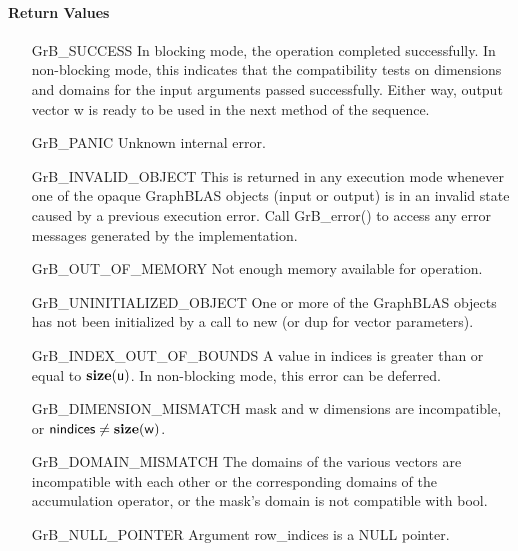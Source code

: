 \paragraph{Return Values}

\begin{itemize}[leftmargin=2.1in]
    \item[{\sf GrB\_SUCCESS}]         In blocking mode, the operation completed
    successfully. In non-blocking mode, this indicates that the compatibility 
    tests on dimensions and domains for the input arguments passed successfully. 
    Either way, output vector {\sf w} is ready to be used in the next method of 
    the sequence.

    \item[{\sf GrB\_PANIC}]           Unknown internal error.

    \item[{\sf GrB\_INVALID\_OBJECT}] This is returned in any execution mode 
    whenever one of the opaque GraphBLAS objects (input or output) is in an invalid 
    state caused by a previous execution error.  Call {\sf GrB\_error()} to access 
    any error messages generated by the implementation.

    \item[{\sf GrB\_OUT\_OF\_MEMORY}] Not enough memory available for operation.

    \item[{\sf GrB\_UNINITIALIZED\_OBJECT}] One or more of the GraphBLAS objects
    has not been initialized by a call to {\sf new} (or {\sf dup} for vector
    parameters).

    \item[{\sf GrB\_INDEX\_OUT\_OF\_BOUNDS}]  A value in {\sf indices} is greater
    than or equal to $\bold{size}({\sf u})$.  In non-blocking mode, this error can be deferred.

    \item[{\sf GrB\_DIMENSION\_MISMATCH}]  {\sf mask} and {\sf w} dimensions are
    incompatible, or ${\sf nindices} \neq \bold{size}({\sf w})$.

    \item[{\sf GrB\_DOMAIN\_MISMATCH}]    The domains of the various vectors are
    incompatible with each other or the corresponding domains of the
    accumulation operator, or the mask's domain is not compatible with {\sf bool}.

    \item[{\sf GrB\_NULL\_POINTER}] Argument {\sf row\_indices} is a {\sf NULL} pointer.
\end{itemize}


